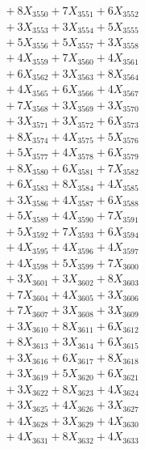 \documentclass[a4paper,10pt]{article}
\begin{document}
{\begin{align}
&\;  + 8 X_{3550} + 7 X_{3551} + 6 X_{3552} \\[0.3ex]
&\;  + 3 X_{3553} + 3 X_{3554} + 5 X_{3555} \\[0.3ex]
&\;  + 5 X_{3556} + 5 X_{3557} + 3 X_{3558} \\[0.3ex]
&\;  + 4 X_{3559} + 7 X_{3560} + 4 X_{3561} \\[0.3ex]
&\;  + 6 X_{3562} + 3 X_{3563} + 8 X_{3564} \\[0.3ex]
&\;  + 4 X_{3565} + 6 X_{3566} + 4 X_{3567} \\[0.3ex]
&\;  + 7 X_{3568} + 3 X_{3569} + 3 X_{3570} \\[0.3ex]
&\;  + 3 X_{3571} + 3 X_{3572} + 6 X_{3573} \\[0.3ex]
&\;  + 8 X_{3574} + 4 X_{3575} + 5 X_{3576} \\[0.3ex]
&\;  + 5 X_{3577} + 4 X_{3578} + 6 X_{3579} \\[0.5ex]\allowbreak
&\;  + 8 X_{3580} + 6 X_{3581} + 7 X_{3582} \\[0.3ex]
&\;  + 6 X_{3583} + 8 X_{3584} + 4 X_{3585} \\[0.3ex]
&\;  + 3 X_{3586} + 4 X_{3587} + 6 X_{3588} \\[0.3ex]
&\;  + 5 X_{3589} + 4 X_{3590} + 7 X_{3591} \\[0.3ex]
&\;  + 5 X_{3592} + 7 X_{3593} + 6 X_{3594} \\[0.3ex]
&\;  + 4 X_{3595} + 4 X_{3596} + 4 X_{3597} \\[0.3ex]
&\;  + 4 X_{3598} + 5 X_{3599} + 7 X_{3600} \\[0.3ex]
&\;  + 3 X_{3601} + 3 X_{3602} + 8 X_{3603} \\[0.3ex]
&\;  + 7 X_{3604} + 4 X_{3605} + 3 X_{3606} \\[0.3ex]
&\;  + 7 X_{3607} + 3 X_{3608} + 3 X_{3609} \\[0.5ex]\allowbreak
&\;  + 3 X_{3610} + 8 X_{3611} + 6 X_{3612} \\[0.3ex]
&\;  + 8 X_{3613} + 3 X_{3614} + 6 X_{3615} \\[0.3ex]
&\;  + 3 X_{3616} + 6 X_{3617} + 8 X_{3618} \\[0.3ex]
&\;  + 3 X_{3619} + 5 X_{3620} + 6 X_{3621} \\[0.3ex]
&\;  + 3 X_{3622} + 8 X_{3623} + 4 X_{3624} \\[0.3ex]
&\;  + 3 X_{3625} + 4 X_{3626} + 3 X_{3627} \\[0.3ex]
&\;  + 4 X_{3628} + 3 X_{3629} + 4 X_{3630} \\[0.3ex]
&\;  + 4 X_{3631} + 8 X_{3632} + 4 X_{3633} \\[0.3ex]

\end{align}}
\end{document}
